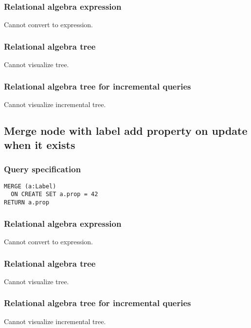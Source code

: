 \subsubsection*{Relational algebra expression}

Cannot convert to expression.

\subsubsection*{Relational algebra tree}

Cannot visualize tree.

\subsubsection*{Relational algebra tree for incremental queries}

Cannot visualize incremental tree.

\subsection{Merge node with label add property on update when it exists}

\subsubsection*{Query specification}

\begin{lstlisting}
MERGE (a:Label)
  ON CREATE SET a.prop = 42
RETURN a.prop
\end{lstlisting}

\subsubsection*{Relational algebra expression}

Cannot convert to expression.

\subsubsection*{Relational algebra tree}

Cannot visualize tree.

\subsubsection*{Relational algebra tree for incremental queries}

Cannot visualize incremental tree.

